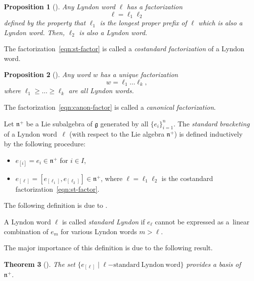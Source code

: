 \documentclass[pdftex]{sigma}
\numberwithin{equation}{section}
\newtheorem{Theorem}{Theorem}[section]
\newtheorem{Proposition}[Theorem]{Proposition}
 { \theoremstyle{definition}
\newtheorem{Definition}[Theorem]{Definition}
\newtheorem{Note}[Theorem]{Note}
\newtheorem{Example}[Theorem]{Example}
\newtheorem{Remark}[Theorem]{Remark} }
\newcommand{\fg}{\mathfrak{g}}
\newcommand{\fn}{\mathfrak{n}}
\begin{document}
\begin{Proposition}[{\cite[Proposition~5.1.3]{Lo}}]%
Any Lyndon word $\ell$ has a factorization
\begin{equation}\label{eqn:st-factor}
 \ell = \ell_1 \ell_2
\end{equation}
defined by the property that $\ell_1$ is the longest proper prefix of $\ell$ which is also a Lyndon word.
Then, $\ell_2$ is also a Lyndon word.
\end{Proposition}

The factorization~\eqref{eqn:st-factor} is called a \textit{costandard factorization} of a Lyndon word.

\begin{Proposition}[{\cite[Proposition~5.1.5]{Lo}}]%
Any word $w$ has a unique factorization
\begin{equation}\label{eqn:canon-factor}
 w = \ell_1 \dots \ell_k,
\end{equation}
where $\ell_1 \geq \dots \geq \ell_k$ are all Lyndon words.
\end{Proposition}

The factorization~\eqref{eqn:canon-factor} is called a \textit{canonical factorization}.

Let $\fn^+$ be a Lie subalgebra of $\fg$ generated by all $\{e_i\}_{i=1}^n$. The \textit{standard bracketing} of a Lyndon word~$\ell$ (with respect to the Lie algebra $\fn^+$) is defined inductively by the following procedure:
\begin{itemize}\itemsep=0pt\samepage
\item[$\bullet$]
$e_{[i]}=e_i\in \fn^+$ for $i \in I$,

\item[$\bullet$]
$e_{[\ell]} = [e_{[\ell_1]}, e_{[\ell_2]}]\in \fn^+$, where $\ell=\ell_1\ell_2$ is
the costandard factorization~\eqref{eqn:st-factor}.

\end{itemize}
The following definition is due to \cite{LR}.

\begin{Definition}%
A Lyndon word $\ell$ is called \textit{standard Lyndon} if $e_{\ell}$ cannot be expressed as
a~linear combination of $e_m$ for various Lyndon words $m>\ell$.
\end{Definition}

The major importance of this definition is due to the following result.

\begin{Theorem}[{\cite{LR}}]%
The set $\bigl\{e_{[\ell]}\mid \ell\mathrm{-standard\ Lyndon\ word}\bigr\}$ provides a basis of $\fn^+$.
\end{Theorem}
\end{document}
